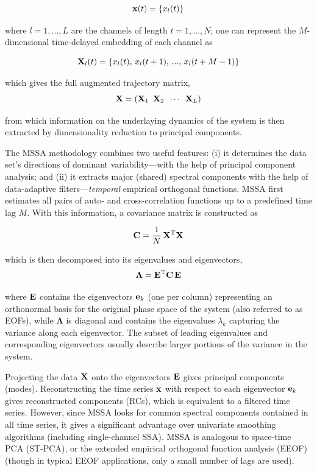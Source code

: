 \begin{equation}
  \mathbf{x}(t) = \{x_l(t)\}
\end{equation}
  
\noindent
where $l = 1,...,L$ are the channels of length $t = 1,...,N$; one can represent the $M$-dimensional time-delayed embedding of each channel as

\begin{equation}
  \mathbf{X}_l(t) = \{x_l(t), \, x_l(t+1), \, ..., \, x_l(t+M-1)\}
\end{equation}

\noindent
which gives the full augmented trajectory matrix,
\begin{equation}
  \mathbf{X} = \left( \mathbf{X}_1 \,\,\, \mathbf{X}_2 \,\,\, \cdots \,\,\, \mathbf{X}_L \right)
\end{equation}

\noindent
from which information on the underlaying dynamics of the system is then extracted by dimensionality reduction to principal components. 

The MSSA methodology combines two useful features: (i) it determines
the data set's directions of dominant variability---with the help of principal component analysis; and (ii) it extracts major (shared) spectral components with the help of data-adaptive filters---{\it temporal} empirical orthogonal functions.
MSSA first estimates all pairs of auto- and cross-correlation functions up
to a predefined time lag $M$. With this information, a covariance matrix is constructed as

\begin{equation}
  \mathbf{C} = \frac{1}{N} \, \mathbf{X}^\text{T} \mathbf{X}
\end{equation}

\noindent
which is then decomposed into its eigenvalues and eigenvectors,
\begin{equation}
  \boldsymbol\Lambda = \mathbf{E}^\text{T} \mathbf{C} \, \mathbf{E}
  \label{eigendecomposition}
\end{equation}

\noindent
where $\mathbf{E}$ contains the eigenvectors $\mathbf{e}_k$ (one per column) representing an orthonormal basis for the original phase space of the system (also referred to as EOFs), while $\boldsymbol\Lambda$ is diagonal and contains the eigenvalues $\lambda_k$ capturing the variance along each eigenvector. The subset of leading eigenvalues and corresponding eigenvectors usually describe larger portions of the variance in the system.

Projecting the data $\mathbf{X}$ onto the eigenvectors $\mathbf{E}$ gives principal components (modes). Reconstructing the time series $\mathbf{x}$ with respect to each eigenvector $\mathbf{e}_k$ gives reconstructed components (RCs), which is equivalent to a filtered time series. However, since MSSA looks for common spectral components contained in all time series, it gives a significant advantage over univariate smoothing algorithms (including single-channel SSA). MSSA is analogous to space-time PCA (ST-PCA), or the extended empirical orthogonal function analysis (EEOF) (though in typical EEOF applications, only a small number of lags are used).

